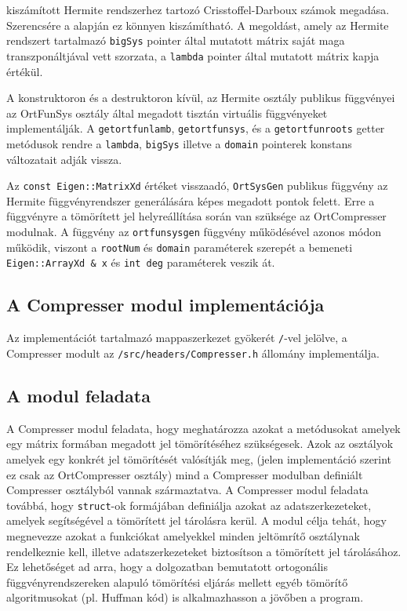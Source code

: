 \documentclass[oneside,titlepage,12pt,a4paper]{report}
\begin{document}
kiszámított Hermite rendszerhez tartozó Crisstoffel-Darboux számok megadása. Szerencsére a \cite{kvadratúra formulás cikk} alapján ez könnyen kiszámítható. A megoldást, amely az Hermite rendszert tartalmazó \texttt{bigSys} pointer által mutatott mátrix saját maga transzponáltjával vett szorzata, a \texttt{lambda} pointer által mutatott mátrix kapja értékül. 
\par A konstruktoron és a destruktoron kívül, az Hermite osztály publikus függvényei az OrtFunSys osztály által megadott tisztán virtuális függvényeket implementálják. A \texttt{getortfunlamb}, \texttt{getortfunsys}, és a \texttt{getortfunroots} getter metódusok rendre a \texttt{lambda}, \texttt{bigSys} illetve a \texttt{domain} pointerek konstans változatait adják vissza. 
\par Az \texttt{const Eigen::MatrixXd} értéket visszaadó, \texttt{OrtSysGen} publikus függvény az Hermite függvényrendszer generálására képes megadott pontok felett. Erre a függvényre a tömörített jel helyreállítása során van szüksége az OrtCompresser modulnak. A függvény az \texttt{ortfunsysgen} függvény működésével azonos módon működik, viszont a \texttt{rootNum} és \texttt{domain} paraméterek szerepét a bemeneti \texttt{Eigen::ArrayXd \& x} és \texttt{int deg} paraméterek veszik át.   

\subsection{A Compresser modul implementációja}

Az implementációt tartalmazó mappaszerkezet gyökerét \texttt{/}-vel jelölve, a Compresser modult  az \texttt{/src/headers/Compresser.h} állomány implementálja.

\subsection*{A modul feladata}

\par A Compresser modul feladata, hogy meghatározza azokat a metódusokat amelyek egy mátrix formában megadott jel tömörítéséhez szükségesek. Azok az osztályok amelyek egy konkrét jel tömörítését valósítják meg, (jelen implementáció szerint ez csak az OrtCompresser osztály) mind a Compresser modulban definiált Compresser osztályból vannak származtatva. A Compresser modul feladata továbbá, hogy \texttt{struct}-ok formájában definiálja azokat az adatszerkezeteket, amelyek segítségével a tömörített jel tárolásra kerül. A modul célja tehát, hogy megnevezze azokat a funkciókat amelyekkel minden jeltömrítő osztálynak rendelkeznie kell, illetve adatszerkezeteket biztosítson a tömörített jel tárolásához. Ez lehetőséget ad arra, hogy a dolgozatban bemutatott ortogonális függvényrendszereken alapuló tömörítési eljárás mellett egyéb tömörítő algoritmusokat (pl. Huffman kód) is alkalmazhasson a jövőben a program.  
\end{document}
